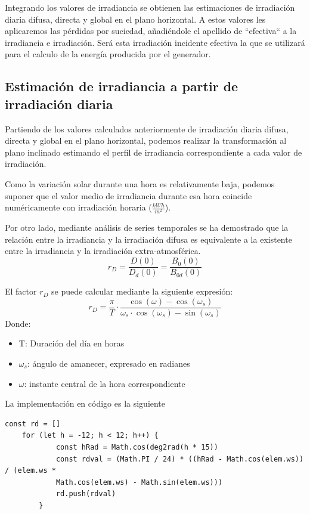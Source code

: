 Integrando los valores de irradiancia se obtienen las estimaciones de irradiación diaria difusa, directa y global en el plano horizontal. A estos valores les aplicaremos las pérdidas por suciedad, añadiéndole el apellido de ``efectiva`` a la irradiancia e irradiación. Será esta irradiación incidente efectiva la que se utilizará para el calculo de la energía producida por el generador.

\subsection{Estimación de irradiancia a partir de irradiación diaria}
\label{section:3.5.1}
Partiendo de los valores calculados anteriormente de irradiación diaria difusa, directa y global en el plano horizontal, podemos realizar la transformación al plano inclinado estimando el perfil de irradiancia correspondiente a cada valor de irradiación.

Como la variación solar durante una hora es relativamente baja, podemos suponer que el valor medio de irradiancia durante esa hora coincide numéricamente con irradiación horaria ($ \frac{kWh}{m^2}$).

Por otro lado, mediante análisis de series temporales se ha demostrado que la relación entre la irradiancia y la irradiación difusa es equivalente a la existente entre la irradiancia y la irradiación extra-atmosférica.
\begin{equation}
	r_D = \frac{D(0)}{D_d(0)} = \frac{B_0(0)}{B_{0d}(0)	}
\end{equation}

El factor $r_D$  se puede calcular mediante la siguiente expresión:
\begin{equation}
r_D = \frac{\pi}{T}\cdot\frac{\cos(\omega)-\cos(\omega_s)}{\omega_s\cdot\cos(\omega_s)-\sin(\omega_s)}
\end{equation}
Donde:
\begin{itemize}
\item T: Duración del día en horas
\item $\omega_s$: ángulo de amanecer, expresado en radianes
\item $\omega$: instante central de la hora correspondiente
\end{itemize}

La implementación en código es la siguiente

\begin{lstlisting}[style=ES6, caption={Cálculo de rD}]
	const rd = []
	for (let h = -12; h < 12; h++) {
			const hRad = Math.cos(deg2rad(h * 15))
			const rdval = (Math.PI / 24) * ((hRad - Math.cos(elem.ws)) / (elem.ws * 
			Math.cos(elem.ws) - Math.sin(elem.ws)))
			rd.push(rdval)
		}
\end{lstlisting}

